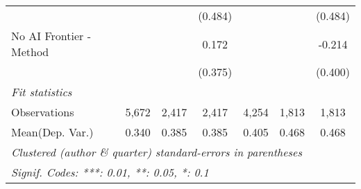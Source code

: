 \begin{tabular}{lcccccc}
                           &               &               & (0.484)      &              &               & (0.484)\\   
   No AI Frontier - Method &               &               & 0.172        &              &               & -0.214\\   
                           &               &               & (0.375)      &              &               & (0.400)\\   
   \midrule
   \emph{Fit statistics}\\
   Observations            & 5,672         & 2,417         & 2,417        & 4,254        & 1,813         & 1,813\\  
Mean(Dep. Var.) & 0.340 & 0.385 & 0.385 & 0.405 & 0.468 & 0.468 \\
   \midrule \midrule
   \multicolumn{7}{l}{\emph{Clustered (author \& quarter) standard-errors in parentheses}}\\
   \multicolumn{7}{l}{\emph{Signif. Codes: ***: 0.01, **: 0.05, *: 0.1}}\\
\end{tabular}
\par\endgroup
